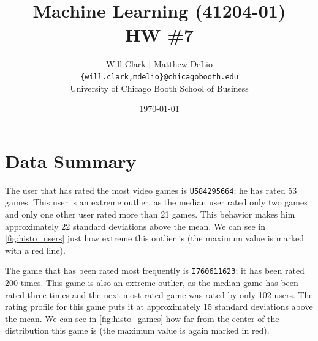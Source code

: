 



\title{Machine Learning (41204-01)\\HW \#7}
\author{Will Clark $\vert$ Matthew DeLio \\
\texttt{\{will.clark,mdelio\}@chicagobooth.edu} \\
University of Chicago Booth School of Business}
\date{\today}
\maketitle

\section{Data Summary}

The user that has rated the most video games is \texttt{U584295664}; he has rated 53 games. This user is an extreme outlier, as the median user rated only two games and only one other user rated more than 21 games. This behavior makes him approximately 22 standard deviations above the mean. We can see in \cref{fig:histo_users} just how extreme this outlier is (the maximum value is marked with a red line).

The game that has been rated most frequently is \texttt{I760611623}; it has been rated 200 times. This game is also an extreme outlier, as the median game has been rated three times and the next most-rated game was rated by only 102 users. The rating profile for this game puts it at approximately 15 standard deviations above the mean. We can see in \cref{fig:histo_games} how far from the center of the distribution this game is (the maximum value is again marked in red).

